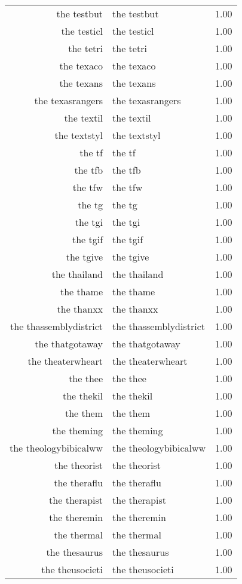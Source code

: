 \begin{table}[ht]
\begin{tabular}{rlr}
  the testbut & the testbut & 1.00 \\ 
  the testicl & the testicl & 1.00 \\ 
  the tetri & the tetri & 1.00 \\ 
  the texaco & the texaco & 1.00 \\ 
  the texans & the texans & 1.00 \\ 
  the texasrangers & the texasrangers & 1.00 \\ 
  the textil & the textil & 1.00 \\ 
  the textstyl & the textstyl & 1.00 \\ 
  the tf & the tf & 1.00 \\ 
  the tfb & the tfb & 1.00 \\ 
  the tfw & the tfw & 1.00 \\ 
  the tg & the tg & 1.00 \\ 
  the tgi & the tgi & 1.00 \\ 
  the tgif & the tgif & 1.00 \\ 
  the tgive & the tgive & 1.00 \\ 
  the thailand & the thailand & 1.00 \\ 
  the thame & the thame & 1.00 \\ 
  the thanxx & the thanxx & 1.00 \\ 
  the thassemblydistrict & the thassemblydistrict & 1.00 \\ 
  the thatgotaway & the thatgotaway & 1.00 \\ 
  the theaterwheart & the theaterwheart & 1.00 \\ 
  the thee & the thee & 1.00 \\ 
  the thekil & the thekil & 1.00 \\ 
  the them & the them & 1.00 \\ 
  the theming & the theming & 1.00 \\ 
  the theologybibicalww & the theologybibicalww & 1.00 \\ 
  the theorist & the theorist & 1.00 \\ 
  the theraflu & the theraflu & 1.00 \\ 
  the therapist & the therapist & 1.00 \\ 
  the theremin & the theremin & 1.00 \\ 
  the thermal & the thermal & 1.00 \\ 
  the thesaurus & the thesaurus & 1.00 \\ 
  the theusocieti & the theusocieti & 1.00 \\ 

\end{tabular}
\end{table}
